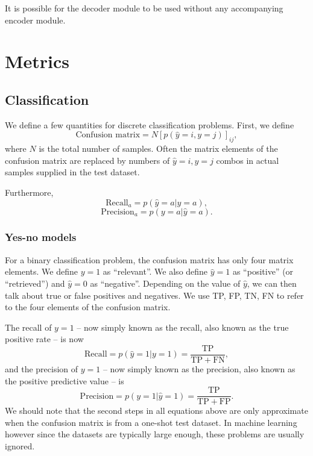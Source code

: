 \documentclass[hyperref, a4paper, 12pt]{report}
\begin{document}
It is possible for the decoder module to be used without any accompanying encoder module.

\chapter{Metrics}

\section{Classification}

We define a few quantities for discrete classification problems.
First, we define
\begin{equation}
    \text{Confusion matrix} = N [p(\hat{y} = i, y = j)]_{ij},
\end{equation}
where $N$ is the total number of samples.
Often the matrix elements of the confusion matrix are replaced by
numbers of $\hat{y} = i, y = j$ combos in actual samples supplied in the test dataset.

Furthermore,
\begin{equation}
    \mathrm{Recall}_a = p(\hat{y} = a | y = a),
\end{equation}
\begin{equation}
    \mathrm{Precision}_a = p(y = a | \hat{y} = a).
\end{equation}

\subsection{Yes-no models}

For a binary classification problem,
the confusion matrix has only four matrix elements.
We define $y=1$ as ``relevant''. 
We also define $\hat{y}=1$ as ``positive'' (or ``retrieved'') and $\hat{y}=0$ as ``negative''.
Depending on the value of $\hat{y}$, we can then talk about true or false positives and negatives.
We use TP, FP, TN, FN to refer to the four elements of the confusion matrix.

The recall of $y=1$ -- now simply known as the recall, also known as the true positive rate -- is now 
\begin{equation}
    \mathrm{Recall} = p(\hat{y} = 1 | y = 1) = \frac{\mathrm{TP}}{\mathrm{TP} + \mathrm{FN}},
\end{equation}
and the precision of $y=1$ -- now simply known as the precision, also known as the positive predictive value -- is 
\begin{equation}
    \mathrm{Precision} = p(y=1 | \hat{y} = 1) = \frac{\mathrm{TP}}{\mathrm{TP} + \mathrm{FP}}.
\end{equation}
We should note that the second steps in all equations above are only approximate
when the confusion matrix is from a one-shot test dataset.
In machine learning however since the datasets are typically large enough,
these problems are usually ignored.
\end{document}
